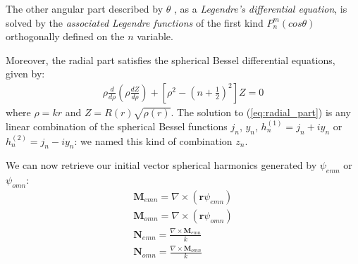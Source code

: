\documentclass{article}
\numberwithin{equation}{section}
\begin{document}
The other angular part described by $\theta$ , as a \textit{Legendre's differential equation}, is solved by the \textit{associated Legendre functions} of the first kind $P_{n}^{m}(cos\theta)$ orthogonally defined on the $n$ variable. 

Moreover, the radial part satisfies the spherical Bessel differential equations, given by:
\begin{align}\label{eq:radial_part}
\rho\frac{d }{d\rho}(\rho\frac{d Z}{d\rho})+[\rho^{2}-(n+\frac{1}{2})^{2}]Z=0
\end{align}
where $\rho=kr$ and $Z=R(r)\sqrt{\rho(r)}$. The solution to (\ref{eq:radial_part}) is any linear combination of the spherical Bessel functions $j_{n}$, $y_{n}$, $h^{(1)}_{n}=j_{n}+iy_{n}$ or $h^{(2)}_{n}=j_{n}-iy_{n}$: we named this kind of combination $z_{n}$.

We can now retrieve our initial vector spherical harmonics generated by $\psi_{emn}$ or $\psi_{omn}$:
\begin{align}
\textbf{M}_{emn}=\nabla \times (\textbf{r}\psi_{emn})\\
\textbf{M}_{omn}=\nabla \times (\textbf{r}\psi_{omn})\\
\textbf{N}_{emn}=\frac{\nabla \times \textbf{M}_{emn}}{k}\\
\textbf{N}_{omn}=\frac{\nabla \times \textbf{M}_{omn}}{k}
\end{align}
\end{document}

